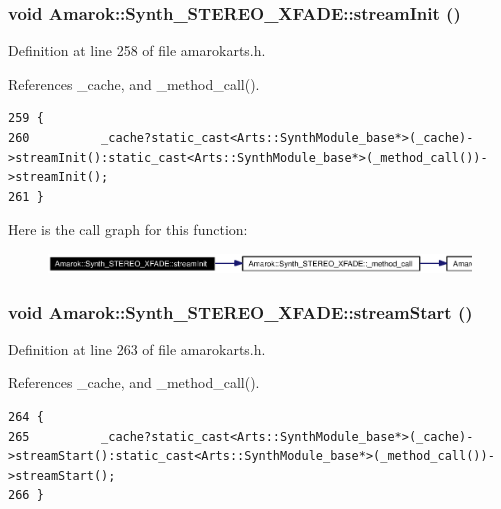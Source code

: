 \subsubsection{\setlength{\rightskip}{0pt plus 5cm}void Amarok::Synth\_\-STEREO\_\-XFADE::stream\-Init ()\hspace{0.3cm}{\tt  [inline]}}\label{classAmarok_1_1Synth__STEREO__XFADE_Amarok_1_1Synth__STEREO__XFADEa12}




Definition at line 258 of file amarokarts.h.

References \_\-cache, and \_\-method\_\-call().



\footnotesize\begin{verbatim}259 {
260          _cache?static_cast<Arts::SynthModule_base*>(_cache)->streamInit():static_cast<Arts::SynthModule_base*>(_method_call())->streamInit();
261 }
\end{verbatim}\normalsize 


Here is the call graph for this function:\begin{figure}[H]
\begin{center}
\leavevmode
\includegraphics[width=394pt]{classAmarok_1_1Synth__STEREO__XFADE_Amarok_1_1Synth__STEREO__XFADEa12_cgraph}
\end{center}
\end{figure}
\subsubsection{\setlength{\rightskip}{0pt plus 5cm}void Amarok::Synth\_\-STEREO\_\-XFADE::stream\-Start ()\hspace{0.3cm}{\tt  [inline]}}\label{classAmarok_1_1Synth__STEREO__XFADE_Amarok_1_1Synth__STEREO__XFADEa13}




Definition at line 263 of file amarokarts.h.

References \_\-cache, and \_\-method\_\-call().



\footnotesize\begin{verbatim}264 {
265          _cache?static_cast<Arts::SynthModule_base*>(_cache)->streamStart():static_cast<Arts::SynthModule_base*>(_method_call())->streamStart();
266 }
\end{verbatim}\normalsize 


